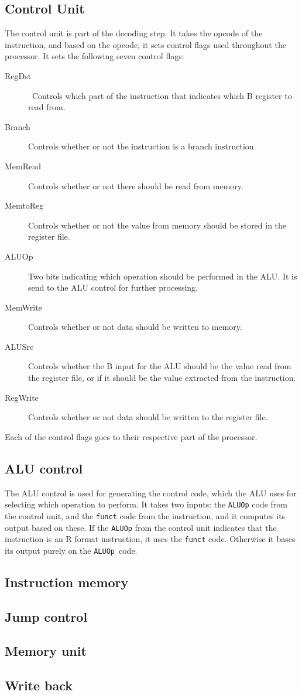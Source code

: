 \subsection{Control Unit}
The control unit is part of the decoding step. It takes the opcode of the
instruction, and based on the opcode, it sets control flags used throughout the
processor. It sets the following seven control flags:
\begin{description}
    \item[RegDst] Controls which part of the instruction that indicates which
        B register to read from.

    \item[Branch] Controls whether or not the instruction is a branch
        instruction.

    \item[MemRead] Controls whether or not there should be read from memory.

    \item[MemtoReg] Controls whether or not the value from memory should be
        stored in the register file.

    \item[ALUOp] Two bits indicating which operation should be performed in
        the ALU. It is send to the ALU control for further processing.

    \item[MemWrite] Controls whether or not data should be written to memory.

    \item[ALUSrc] Controls whether the B input for the ALU should be the
        value read from the register file, or if it should be the value
        extracted from the instruction.

    \item[RegWrite] Controls whether or not data should be written to the
        register file.
\end{description}
Each of the control flags goes to their respective part of the processor.

\subsection{ALU control}\label{sec:alu-control}
The ALU control is used for generating the control code, which the ALU uses for
selecting which operation to perform. It takes two inputs: the \texttt{ALUOp}
code from the control unit, and the \texttt{funct} code from the instruction,
and it computes its output based on these. If the \texttt{ALUOp} from the
control unit indicates that the instruction is an R format instruction, it uses
the \texttt{funct} code. Otherwise it bases its output purely on the
\texttt{ALUOp} code.

\subsection{Instruction memory}
\subsection{Jump control}
\subsection{Memory unit}
\subsection{Write back}
